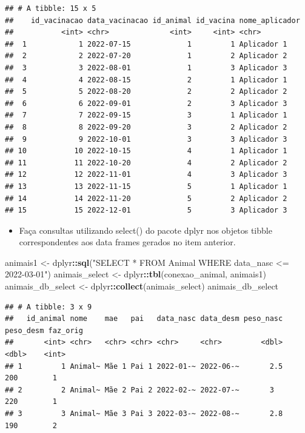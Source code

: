 \documentclass[
]{article}
\newenvironment{Shaded}{\begin{snugshade}}{\end{snugshade}}
\newcommand{\FunctionTok}[1]{\textcolor[rgb]{0.13,0.29,0.53}{\textbf{#1}}}
\newcommand{\NormalTok}[1]{#1}
\newcommand{\OtherTok}[1]{\textcolor[rgb]{0.56,0.35,0.01}{#1}}
\newcommand{\SpecialCharTok}[1]{\textcolor[rgb]{0.81,0.36,0.00}{\textbf{#1}}}
\newcommand{\StringTok}[1]{\textcolor[rgb]{0.31,0.60,0.02}{#1}}
\providecommand{\tightlist}{%
  \setlength{\itemsep}{0pt}\setlength{\parskip}{0pt}}
\begin{document}
\begin{verbatim}
## # A tibble: 15 x 5
##    id_vacinacao data_vacinacao id_animal id_vacina nome_aplicador
##           <int> <chr>              <int>     <int> <chr>         
##  1            1 2022-07-15             1         1 Aplicador 1   
##  2            2 2022-07-20             1         2 Aplicador 2   
##  3            3 2022-08-01             1         3 Aplicador 3   
##  4            4 2022-08-15             2         1 Aplicador 1   
##  5            5 2022-08-20             2         2 Aplicador 2   
##  6            6 2022-09-01             2         3 Aplicador 3   
##  7            7 2022-09-15             3         1 Aplicador 1   
##  8            8 2022-09-20             3         2 Aplicador 2   
##  9            9 2022-10-01             3         3 Aplicador 3   
## 10           10 2022-10-15             4         1 Aplicador 1   
## 11           11 2022-10-20             4         2 Aplicador 2   
## 12           12 2022-11-01             4         3 Aplicador 3   
## 13           13 2022-11-15             5         1 Aplicador 1   
## 14           14 2022-11-20             5         2 Aplicador 2   
## 15           15 2022-12-01             5         3 Aplicador 3
\end{verbatim}

\begin{itemize}
\tightlist
\item
  Faça consultas utilizando select() do pacote dplyr nos objetos tibble
  correspondentes aos data frames gerados no item anterior.
\end{itemize}

\begin{Shaded}
\begin{Highlighting}[]
\NormalTok{animais1 }\OtherTok{\textless{}{-}}\NormalTok{ dplyr}\SpecialCharTok{::}\FunctionTok{sql}\NormalTok{(}\StringTok{"SELECT * FROM Animal WHERE data\_nasc \textless{}= \textquotesingle{}2022{-}03{-}01\textquotesingle{}"}\NormalTok{)}
\NormalTok{animais\_select }\OtherTok{\textless{}{-}}\NormalTok{ dplyr}\SpecialCharTok{::}\FunctionTok{tbl}\NormalTok{(conexao\_animal, animais1)}
\NormalTok{animais\_db\_select }\OtherTok{\textless{}{-}}\NormalTok{ dplyr}\SpecialCharTok{::}\FunctionTok{collect}\NormalTok{(animais\_select)}
\NormalTok{animais\_db\_select}
\end{Highlighting}
\end{Shaded}

\begin{verbatim}
## # A tibble: 3 x 9
##   id_animal nome    mae   pai   data_nasc data_desm peso_nasc peso_desm faz_orig
##       <int> <chr>   <chr> <chr> <chr>     <chr>         <dbl>     <dbl>    <int>
## 1         1 Animal~ Mãe 1 Pai 1 2022-01-~ 2022-06-~       2.5       200        1
## 2         2 Animal~ Mãe 2 Pai 2 2022-02-~ 2022-07-~       3         220        1
## 3         3 Animal~ Mãe 3 Pai 3 2022-03-~ 2022-08-~       2.8       190        2
\end{verbatim}
\end{document}
